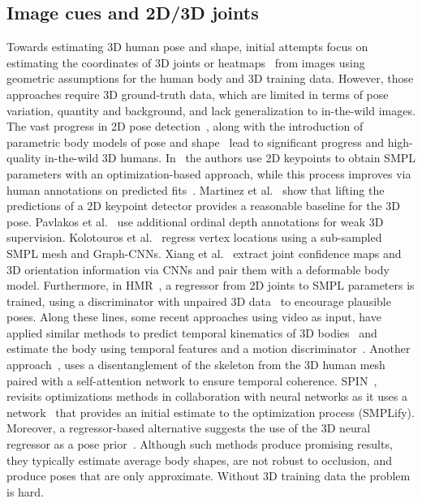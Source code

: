 \documentclass[10pt,twocolumn,letterpaper]{article}
\begin{document}
\subsection{Image cues and 2D/3D joints}
Towards estimating  3D human pose and shape, initial attempts focus on estimating the coordinates of 3D joints or heatmaps~\cite{Hogg1983ModelbasedVA,Li20143DHP, Pavlakos2017CoarsetoFineVP, Sigal2004TrackingLP,SimoSerra2013AJM, Stoll2011FastAM, Sun2017CompositionalHP} from images using geometric assumptions for the human body and 3D training data. However, those approaches require 3D ground-truth data, which are limited in terms of pose variation, quantity and background, and lack generalization to in-the-wild images. The vast progress in 2D pose detection~\cite{Cao2021OpenPoseRM,Newell2016StackedHN,Sun2019DeepHR, Xiao2018SimpleBF}, along with the introduction of parametric body models of pose and shape~\cite{Anguelov2005SCAPESC,smpl} lead to significant progress and high-quality in-the-wild 3D humans. In~\cite{smplify} the authors use 2D keypoints to obtain SMPL parameters with an optimization-based approach, while this process improves via human annotations on predicted fits~\cite{Lassner2017UniteTP}. Martinez et al.~\cite{Martinez2017ASY} show that lifting the predictions of a 2D keypoint detector provides a reasonable baseline for the 3D pose. Pavlakos et al.~\cite{Pavlakos2018OrdinalDS} use additional ordinal depth annotations for weak 3D supervision. Kolotouros et al.~\cite{Kolotouros2019ConvolutionalMR} regress vertex locations using a sub-sampled SMPL mesh and Graph-CNNs. Xiang et al.~\cite{Xiang2019MonocularTC} extract joint confidence maps and 3D orientation information via CNNs and pair them with a deformable body model. Furthermore, in HMR~\cite{hmr}, a regressor from 2D joints to SMPL parameters is trained, using a discriminator with unpaired 3D data~\cite{Mahmood2019AMASSAO} to encourage plausible poses. Along these lines, some recent approaches using video as input, have applied similar methods to predict temporal kinematics of 3D bodies~\cite{Kanazawa2019Learning3H} and estimate the body using temporal features and a motion discriminator~\cite{Kocabas2020VIBEVI}. Another approach~\cite{Yu2019HumanMR}, uses a disentanglement of the skeleton from the 3D human mesh paired with a self-attention network to ensure temporal coherence. SPIN~\cite{spin}, revisits optimizations methods in collaboration with neural networks as it uses a network~\cite{hmr} that provides an initial estimate to the optimization process (SMPLify). Moreover, a regressor-based alternative suggests the use of the 3D neural regressor as a pose prior~\cite{eft}. Although such methods produce promising results, they typically estimate average body shapes, are not robust to occlusion, and produce poses that are only approximate. Without 3D training data the problem is hard.
\end{document}
